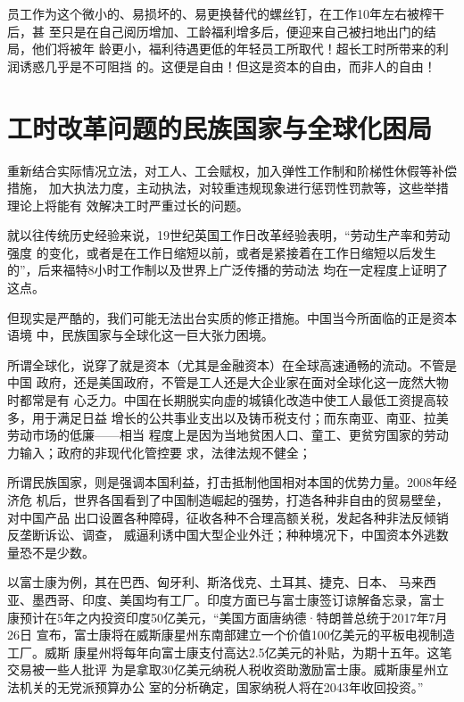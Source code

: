 
员工作为这个微小的、易损坏的、易更换替代的螺丝钉，在工作10年左右被榨干后，甚
至只是在自己阅历增加、工龄福利增多后，便迎来自己被扫地出门的结局，他们将被年
龄更小，福利待遇更低的年轻员工所取代！超长工时所带来的利润诱惑几乎是不可阻挡
的。这便是自由！但这是资本的自由，而非人的自由！

\section{工时改革问题的民族国家与全球化困局}

重新结合实际情况立法，对工人、工会赋权，加入弹性工作制和阶梯性休假等补偿措施，
加大执法力度，主动执法，对较重违规现象进行惩罚性罚款等，这些举措理论上将能有
效解决工时严重过长的问题。

就以往传统历史经验来说，19世纪英国工作日改革经验表明，“劳动生产率和劳动强度
的变化，或者是在工作日缩短以前，或者是紧接着在工作日缩短以后发生
的”\cite[601]{capital}，后来福特8小时工作制以及世界上广泛传播的劳动法
均在一定程度上证明了这点。

但现实是严酷的，我们可能无法出台实质的修正措施。中国当今所面临的正是资本语境
中，民族国家与全球化这一巨大张力困境。

所谓全球化，说穿了就是资本（尤其是金融资本）在全球高速通畅的流动。不管是中国
政府，还是美国政府，不管是工人还是大企业家在面对全球化这一庞然大物时都常是有
心乏力。中国在长期脱实向虚的城镇化改造中使工人最低工资提高较多，用于满足日益
增长的公共事业支出以及铸币税支付；而东南亚、南亚、拉美劳动市场的低廉——相当
程度上是因为当地贫困人口、童工、更贫穷国家的劳动力输入；政府的非现代化管控要
求，法律法规不健全；

所谓民族国家，则是强调本国利益，打击抵制他国相对本国的优势力量。2008年经济危
机后，世界各国看到了中国制造崛起的强势，打造各种非自由的贸易壁垒，对中国产品
出口设置各种障碍，征收各种不合理高额关税，发起各种非法反倾销反垄断诉讼、调查，
威逼利诱中国大型企业外迁；种种境况下，中国资本外逃数量恐不是少数。


以富士康\cite{foxconnwiki}为例，其在巴西、匈牙利、斯洛伐克、土耳其、捷克、日本、
马来西亚、墨西哥、印度、美国均有工厂。印度方面已与富士康签订谅解备忘录，富士
康预计在5年之内投资印度50亿美元，“美国方面唐纳德·特朗普总统于2017年7月26日
宣布，富士康将在威斯康星州东南部建立一个价值100亿美元的平板电视制造工厂。威斯
康星州将每年向富士康支付高达2.5亿美元的补贴，为期十五年。这笔交易被一些人批评
为是拿取30亿美元纳税人税收资助激励富士康。威斯康星州立法机关的无党派预算办公
室的分析确定，国家纳税人将在2043年收回投资。”

